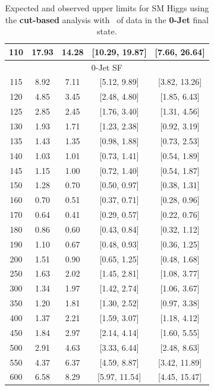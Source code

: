 \begin{table}[hbp!]
\begin{center}
\begin{tabular}{c c c c c}
110 & 17.93 & 14.28 & [10.29, 19.87] & [7.66, 26.64] \\
\hline
\multicolumn{5}{c}{0-Jet SF} \\
\hline
115 & 8.92 & 7.11 & [5.12, 9.89] & [3.82, 13.26] \\
120 & 4.85 & 3.45 & [2.48, 4.80] & [1.85, 6.43] \\
125 & 2.85 & 2.45 & [1.76, 3.40] & [1.31, 4.56] \\
130 & 1.93 & 1.71 & [1.23, 2.38] & [0.92, 3.19] \\
135 & 1.43 & 1.35 & [0.98, 1.88] & [0.73, 2.53] \\
140 & 1.03 & 1.01 & [0.73, 1.41] & [0.54, 1.89] \\
145 & 1.15 & 1.00 & [0.72, 1.40] & [0.54, 1.87] \\
150 & 1.28 & 0.70 & [0.50, 0.97] & [0.38, 1.31] \\
160 & 0.70 & 0.51 & [0.37, 0.71] & [0.28, 0.96] \\
170 & 0.64 & 0.41 & [0.29, 0.57] & [0.22, 0.76] \\
180 & 0.86 & 0.60 & [0.43, 0.84] & [0.32, 1.12] \\
190 & 1.10 & 0.67 & [0.48, 0.93] & [0.36, 1.25] \\
200 & 1.51 & 0.90 & [0.65, 1.25] & [0.48, 1.68] \\
250 & 1.63 & 2.02 & [1.45, 2.81] & [1.08, 3.77] \\
300 & 1.34 & 1.97 & [1.42, 2.74] & [1.06, 3.67] \\
350 & 1.20 & 1.81 & [1.30, 2.52] & [0.97, 3.38] \\
400 & 1.37 & 2.21 & [1.59, 3.07] & [1.18, 4.12] \\
450 & 1.84 & 2.97 & [2.14, 4.14] & [1.60, 5.55] \\
500 & 2.91 & 4.63 & [3.33, 6.44] & [2.48, 8.63] \\
550 & 4.37 & 6.37 & [4.59, 8.87] & [3.42, 11.89] \\
600 & 6.58 & 8.29 & [5.97, 11.54] & [4.45, 15.47] \\

\hline
\end{tabular}
\caption{Expected and observed upper limits for SM Higgs using the
  {\bf cut-based} analysis with \intlumiEightTeV\ of data in the {\bf 0-Jet} final state.}
\label{tab:cutbase_uls_0j}
\end{center}
\end{table}

